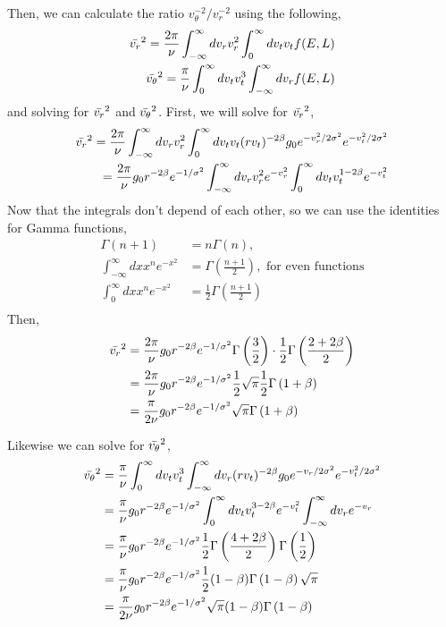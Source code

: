 Then, we can calculate the ratio $v^{-2}_\theta/v^{-2}_r$ using the following,
\begin{align}
    \Bar{v_r}^2=\frac{2\pi}{\nu}\int_{-\infty}^{\infty} dv_r v_r^2 \int_{0}^{\infty} dv_t v_t f(E,L)\\
    \Bar{v_\theta}^2=\frac{\pi}{\nu}\int_{0}^{\infty} dv_t v_t^3 \int_{-\infty}^{\infty} dv_r f(E,L)
\end{align}
and solving for $\Bar{v_r}^2$ and $\Bar{v_\theta}^2$.
First, we will solve for $\Bar{v_r}^2$,
\begin{align*}
    \Bar{v_r}^2=\frac{2\pi}{\nu}\int_{-\infty}^{\infty} dv_r v_r^2 \int_{0}^{\infty} dv_t v_t (rv_t)^{-2\beta}g_0e^{-v_r^2/2\sigma^2}e^{-v_t^2/2\sigma^2}\\
    =\frac{2\pi}{\nu}g_0r^{-2\beta}e^{-1/\sigma^2}\int_{-\infty}^{\infty} dv_rv_r^2e^{-v_r^2}\int_{0}^{\infty} dv_t v_t^{1-2\beta}e^{-v_t^2}\\
\end{align*}
Now that the integrals don't depend of each other, so we can use the identities for Gamma functions,
\begin{align}
    \Gamma(n+1)&=n\Gamma(n),\\
    \int_{-\infty}^{\infty}dx x^ne^{-x^2}&=\Gamma\left(\frac{n+1}{2}\right), \text{ for even functions}\\
    \int_{0}^{\infty}dx x^ne^{-x^2}&=\frac{1}{2}\Gamma\left(\frac{n+1}{2}\right)\\
\end{align}
Then,
\begin{align*}
     \Bar{v_r}^2&=\frac{2\pi}{\nu}g_0r^{-2\beta}e^{-1/\sigma^2}\Gamma\left(\frac{3}{2}\right)\cdot\frac{1}{2}\Gamma\left(\frac{2+2\beta}{2}\right)\\
     &=\frac{2\pi}{\nu}g_0r^{-2\beta}e^{-1/\sigma^2}\frac{1}{2}\sqrt{\pi}\frac{1}{2}\Gamma\left(1+\beta\right)\\
     &=\frac{\pi}{2\nu}g_0r^{-2\beta}e^{-1/\sigma^2}\sqrt{\pi}\Gamma\left(1+\beta\right)
\end{align*}

Likewise we can solve for $\Bar{v_\theta}^2$,
\begin{align*}
    \Bar{v_\theta}^2&=\frac{\pi}{\nu}\int_{0}^{\infty} dv_t v_t^3 \int_{-\infty}^{\infty} dv_r (rv_t)^{-2\beta}g_0e^{-v_r/2\sigma^2}e^{-v_t^2/2\sigma^2}\\
    &=\frac{\pi}{\nu}g_0r^{-2\beta}e^{-1/\sigma^2}\int_{0}^{\infty} dv_t v_t^{3-2\beta}e^{-v_t^2} \int_{-\infty}^{\infty} dv_re^{-v_r}\\
    &=\frac{\pi}{\nu}g_0r^{-2\beta}e^{-1/\sigma^2}\frac{1}{2}\Gamma\left(\frac{4+2\beta}{2}\right)\Gamma\left(\frac{1}{2}\right)\\
    &=\frac{\pi}{\nu}g_0r^{-2\beta}e^{-1/\sigma^2}\frac{1}{2}(1-\beta)\Gamma\left(1-\beta\right)\sqrt{\pi}\\
    &=\frac{\pi}{2\nu}g_0r^{-2\beta}e^{-1/\sigma^2}\sqrt{\pi}(1-\beta)\Gamma\left(1-\beta\right)
\end{align*}

